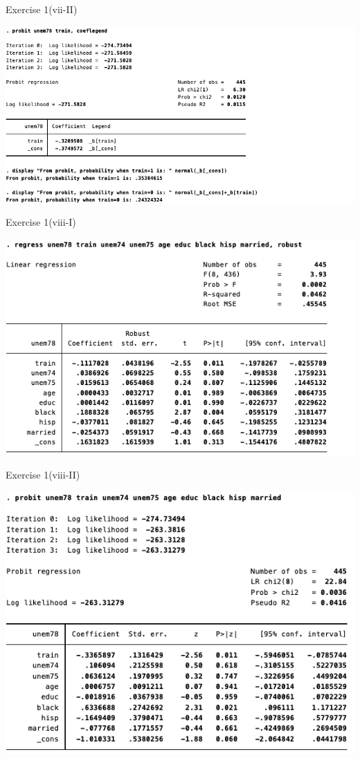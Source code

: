\documentclass[
  10pt,
  ignorenonframetext,
]{beamer}
\begin{document}
\begin{frame}{Exercise 1(vii-II)}
\protect\hypertarget{PROBITsimplereg_predict}{}
\begin{center}\includegraphics[width=0.9\linewidth]{pictures/PROBITsimplereg_predict} \end{center}
\end{frame}

\begin{frame}{Exercise 1(viii-I)}
\protect\hypertarget{LMPwithcontrols}{}
\begin{center}\includegraphics[width=0.9\linewidth]{pictures/LMPwithcontrols} \end{center}
\end{frame}

\begin{frame}{Exercise 1(viii-II)}
\protect\hypertarget{PROBITwithcontrols}{}
\begin{center}\includegraphics[width=0.9\linewidth]{pictures/PROBITwithcontrols} \end{center}
\end{frame}
\end{document}
